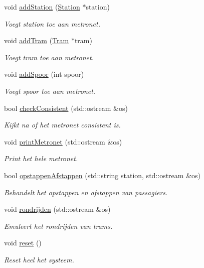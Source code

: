 \begin{DoxyCompactItemize}
void \hyperlink{class_metronet_ac7f4069e577cd4dddb1e166923df3ecb}{add\+Station} (\hyperlink{class_station}{Station} $\ast$station)
\begin{DoxyCompactList}\small\item\em Voegt station toe aan metronet. \end{DoxyCompactList}\item 
void \hyperlink{class_metronet_a3a01132772f4a367d83af40a3c02e224}{add\+Tram} (\hyperlink{class_tram}{Tram} $\ast$tram)
\begin{DoxyCompactList}\small\item\em Voegt tram toe aan metronet. \end{DoxyCompactList}\item 
void \hyperlink{class_metronet_a0422381a8d7f32a915e0ad966af43627}{add\+Spoor} (int spoor)
\begin{DoxyCompactList}\small\item\em Voegt spoor toe aan metronet. \end{DoxyCompactList}\item 
bool \hyperlink{class_metronet_a3125e980b208f1cdd04a9c26ec92a7bf}{check\+Consistent} (std\+::ostream \&os)
\begin{DoxyCompactList}\small\item\em Kijkt na of het metronet consistent is. \end{DoxyCompactList}\item 
void \hyperlink{class_metronet_a3d8b85c241fff3a9353c06320226e84e}{print\+Metronet} (std\+::ostream \&os)
\begin{DoxyCompactList}\small\item\em Print het hele metronet. \end{DoxyCompactList}\item 
bool \hyperlink{class_metronet_a78c0cd9912306a5f7438ea43f5088e0a}{opstappen\+Afstappen} (std\+::string station, std\+::ostream \&os)
\begin{DoxyCompactList}\small\item\em Behandelt het opstappen en afstappen van passagiers. \end{DoxyCompactList}\item 
void \hyperlink{class_metronet_a180b666c7d4cc52f873579ab7f95ea35}{rondrijden} (std\+::ostream \&os)
\begin{DoxyCompactList}\small\item\em Emuleert het rondrijden van trams. \end{DoxyCompactList}\item 
void \hyperlink{class_metronet_aae72fb7ad05324adb1ccc6a1519c5c0b}{reset} ()
\begin{DoxyCompactList}\small\item\em Reset heel het systeem. \end{DoxyCompactList}\end{DoxyCompactItemize}


